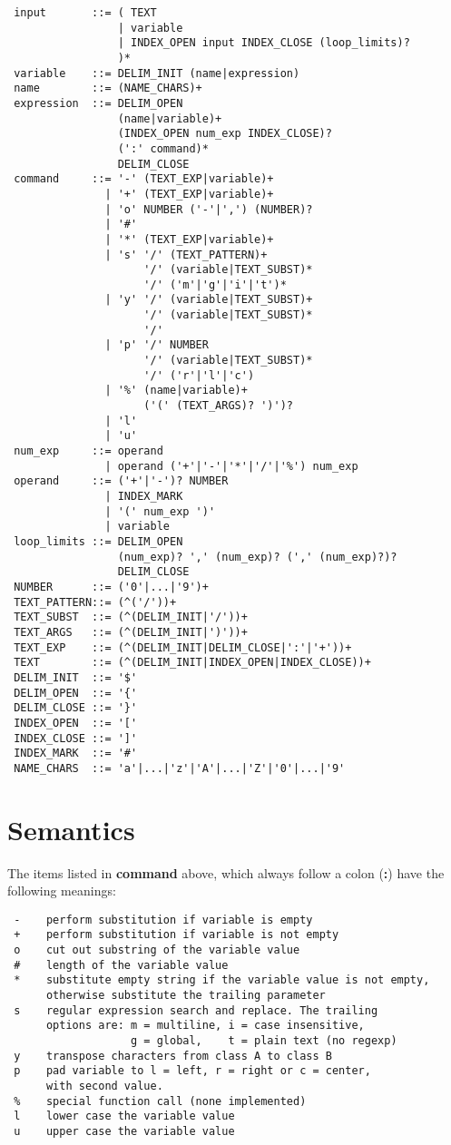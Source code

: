 \footnotesize
\begin{verbatim}
 input       ::= ( TEXT
                 | variable
                 | INDEX_OPEN input INDEX_CLOSE (loop_limits)?
                 )*
 variable    ::= DELIM_INIT (name|expression)
 name        ::= (NAME_CHARS)+
 expression  ::= DELIM_OPEN
                 (name|variable)+
                 (INDEX_OPEN num_exp INDEX_CLOSE)?
                 (':' command)*
                 DELIM_CLOSE
 command     ::= '-' (TEXT_EXP|variable)+
               | '+' (TEXT_EXP|variable)+
               | 'o' NUMBER ('-'|',') (NUMBER)?
               | '#'
               | '*' (TEXT_EXP|variable)+
               | 's' '/' (TEXT_PATTERN)+
                     '/' (variable|TEXT_SUBST)*
                     '/' ('m'|'g'|'i'|'t')*
               | 'y' '/' (variable|TEXT_SUBST)+
                     '/' (variable|TEXT_SUBST)*
                     '/'
               | 'p' '/' NUMBER
                     '/' (variable|TEXT_SUBST)*
                     '/' ('r'|'l'|'c')
               | '%' (name|variable)+
                     ('(' (TEXT_ARGS)? ')')?
               | 'l'
               | 'u'
 num_exp     ::= operand
               | operand ('+'|'-'|'*'|'/'|'%') num_exp
 operand     ::= ('+'|'-')? NUMBER
               | INDEX_MARK
               | '(' num_exp ')'
               | variable
 loop_limits ::= DELIM_OPEN
                 (num_exp)? ',' (num_exp)? (',' (num_exp)?)?
                 DELIM_CLOSE
 NUMBER      ::= ('0'|...|'9')+
 TEXT_PATTERN::= (^('/'))+
 TEXT_SUBST  ::= (^(DELIM_INIT|'/'))+
 TEXT_ARGS   ::= (^(DELIM_INIT|')'))+
 TEXT_EXP    ::= (^(DELIM_INIT|DELIM_CLOSE|':'|'+'))+
 TEXT        ::= (^(DELIM_INIT|INDEX_OPEN|INDEX_CLOSE))+
 DELIM_INIT  ::= '$'
 DELIM_OPEN  ::= '{'
 DELIM_CLOSE ::= '}'
 INDEX_OPEN  ::= '['
 INDEX_CLOSE ::= ']'
 INDEX_MARK  ::= '#'
 NAME_CHARS  ::= 'a'|...|'z'|'A'|...|'Z'|'0'|...|'9'
\end{verbatim}
\normalsize

\section{Semantics}

The items listed in {\bf command} above, which always follow a colon ({\bf :})
have the following meanings: 

\footnotesize
\begin{verbatim}
 -    perform substitution if variable is empty
 +    perform substitution if variable is not empty
 o    cut out substring of the variable value
 #    length of the variable value
 *    substitute empty string if the variable value is not empty,
      otherwise substitute the trailing parameter
 s    regular expression search and replace. The trailing
      options are: m = multiline, i = case insensitive,
                   g = global,    t = plain text (no regexp)
 y    transpose characters from class A to class B
 p    pad variable to l = left, r = right or c = center,
      with second value.
 %    special function call (none implemented)
 l    lower case the variable value
 u    upper case the variable value
\end{verbatim}
\normalsize

